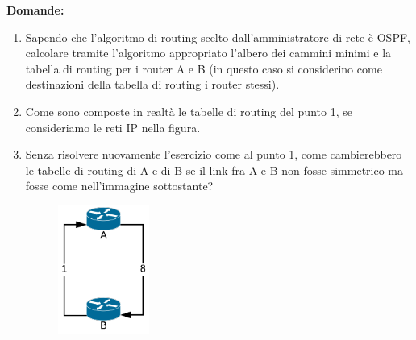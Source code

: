 \documentclass[10pt]{article}
\begin{document}
			\textbf{Domande:}
			\begin{enumerate}
				\item Sapendo che l'algoritmo di routing scelto dall'amministratore di rete è OSPF, calcolare tramite l'algoritmo appropriato l'albero dei cammini minimi e la tabella di routing per i router A e B (in questo caso si considerino come destinazioni della tabella di routing i router stessi).
				\item Come sono composte in realtà le tabelle di routing del punto 1, se consideriamo le reti IP nella figura.
				\item Senza risolvere nuovamente l'esercizio come al punto 1, come cambierebbero le tabelle di routing di A e di B se il link fra A e B non fosse simmetrico ma fosse come nell'immagine sottostante?
					\begin{figure}[h]
						\centering
						\includegraphics[width=3cm]{Esame_1 11-01-2019}
					\end{figure}
			\end{enumerate}

			\newpage
\end{document}
